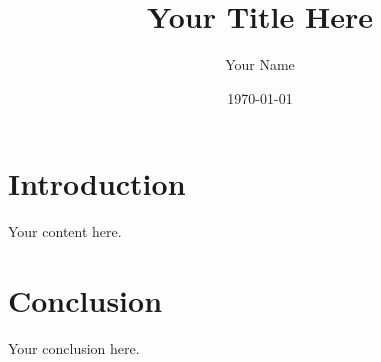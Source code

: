 \documentclass{article}
\title{Your Title Here}
\author{Your Name}
\date{\today}
\begin{document}
\maketitle

\section{Introduction}
Your content here.

\section{Conclusion}
Your conclusion here.
\end{document}
